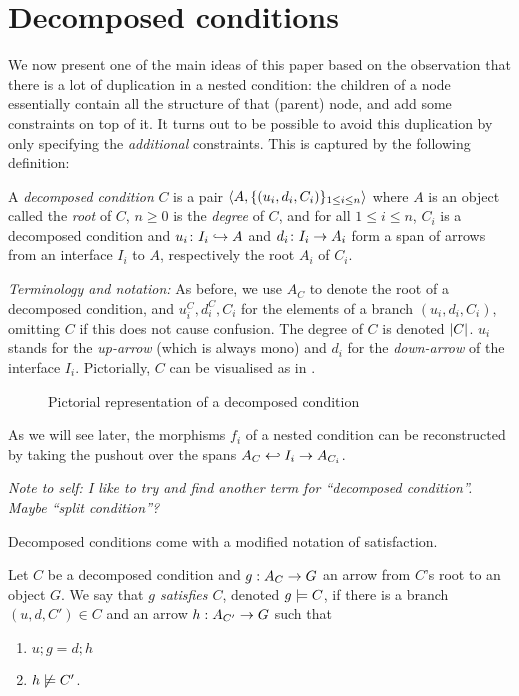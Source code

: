 \section{Decomposed conditions}

We now present one of the main ideas of this paper based on the observation that there is a lot of duplication in a nested condition: the children of a node essentially contain all the structure of that (parent) node, and add some constraints on top of it. It turns out to be possible to avoid this duplication by only specifying the \emph{additional} constraints. This is captured by the following definition:

\begin{definition}
  A \emph{decomposed condition} $C$ is a pair $\langle{A,\{{(u_i,d_i,C_i)}\}_{1\leq i\leq n}}\rangle$ where $A$ is an object called the \emph{root} of $C$, $n\geq 0$ is the \emph{degree} of $C$, and for all $1\leq i\leq n$, $C_i$ is a decomposed condition and $u_i\colon I_i\hookrightarrow A$ and $d_i\colon I_i\rightarrow A_i$ form a span of arrows from an interface $I_i$ to $A$, respectively the root $A_i$ of $C_i$.
\end{definition}
%
\emph{Terminology and notation:} As before, we use $A_C$ to denote the root of a decomposed condition, and $u^C_i,d^C_i,C_i$ for the elements of a branch $(u_i,d_i,C_i)$, omitting $C$ if this does not cause confusion. The degree of $C$ is denoted $|{C}|$. $u_i$ stands for the \emph{up-arrow} (which is always mono) and $d_i$ for the \emph{down-arrow} of the interface $I_i$. Pictorially, $C$ can be visualised as in .
%
\begin{figure}
  \centering
  
  \caption{Pictorial representation of a decomposed condition}
\end{figure}
%
As we will see later, the morphisms $f_i$ of a nested condition can be reconstructed by taking the pushout over the spans $A_C\hookleftarrow I_i\rightarrow A_{C_i}$.

\medskip\noindent\emph{Note to self: I like to try and find another term for ``decomposed condition''. Maybe ``split condition''?}

\medskip\noindent Decomposed conditions come with a modified notation of satisfaction.

\begin{definition}
  Let $C$ be a decomposed condition and $g:A_C\rightarrow G$ an arrow from $C$'s root to an object $G$. We say that \emph{$g$ satisfies $C$}, denoted $g\models C$, if there is a branch $(u,d,C')\in C$ and an arrow $h:A_{C'}\rightarrow G$ such that
  \begin{enumerate}
  \item $u;g=d;h$
  \item $h\not\models C'$.
  \end{enumerate}
\end{definition}
%

